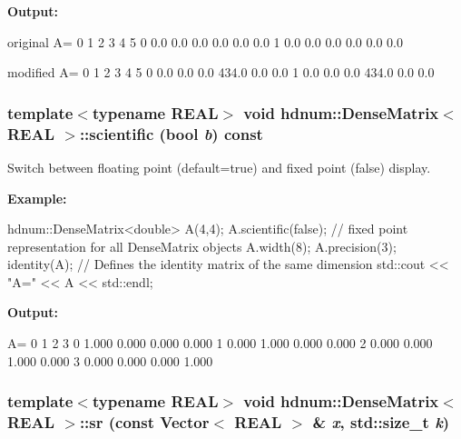 {\bfseries Output:} \begin{DoxyVerb}
original A=
                    0        1        2        3        4        5 
          0       0.0      0.0      0.0      0.0      0.0      0.0 
          1       0.0      0.0      0.0      0.0      0.0      0.0 

modified A=
                    0        1        2        3        4        5 
          0       0.0      0.0      0.0    434.0      0.0      0.0 
          1       0.0      0.0      0.0    434.0      0.0      0.0 
	  \end{DoxyVerb}
 \hypertarget{classhdnum_1_1DenseMatrix_afef39f0ff9f8ade07b226172b425fb2f}{
\subsubsection[{scientific}]{\setlength{\rightskip}{0pt plus 5cm}template$<$typename REAL$>$ void {\bf hdnum::DenseMatrix}$<$ REAL $>$::scientific (bool {\em b}) const}}
\label{classhdnum_1_1DenseMatrix_afef39f0ff9f8ade07b226172b425fb2f}


Switch between floating point (default=true) and fixed point (false) display. 

{\bfseries Example:} 
\begin{DoxyCode}
  hdnum::DenseMatrix<double> A(4,4);
  A.scientific(false); // fixed point representation for all DenseMatrix objects
  A.width(8);
  A.precision(3);
  identity(A);  // Defines the identity matrix of the same dimension
  std::cout << "A=" << A << std::endl;
\end{DoxyCode}


{\bfseries Output:} \begin{DoxyVerb}
A=
                    0        1        2        3 
          0     1.000    0.000    0.000    0.000 
          1     0.000    1.000    0.000    0.000 
          2     0.000    0.000    1.000    0.000 
          3     0.000    0.000    0.000    1.000 
	  \end{DoxyVerb}
 \hypertarget{classhdnum_1_1DenseMatrix_a833f6bd37078251cb91018a7c0c339aa}{
\subsubsection[{sr}]{\setlength{\rightskip}{0pt plus 5cm}template$<$typename REAL$>$ void {\bf hdnum::DenseMatrix}$<$ REAL $>$::sr (const {\bf Vector}$<$ REAL $>$ \& {\em x}, \/  std::size\_\-t {\em k})}}
\label{classhdnum_1_1DenseMatrix_a833f6bd37078251cb91018a7c0c339aa}



